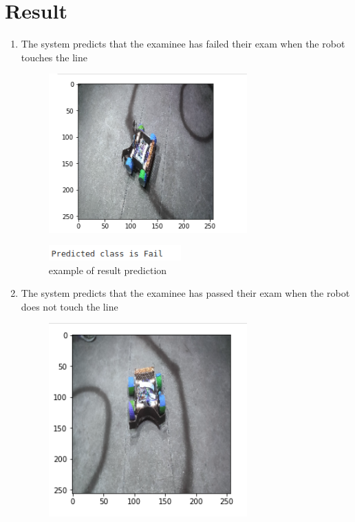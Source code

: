 \section{Result}
\begin{enumerate}
\item The system predicts that the examinee has failed their exam when the robot touches the line
\begin{figure}[H] %
\begin{center}
	\includegraphics[width = 3in]{images/linet.png}
	\label{figSample1} %
\end{center}
\end{figure}
\begin{figure}[H] %
\begin{center}
	\includegraphics[width = 2in]{images/linetr.png}
	\caption{example of result prediction} %
	\label{figSample1} %
\end{center}
\end{figure}
\item The system predicts that the examinee has passed their exam when the robot does not touch the line
\begin{figure}[H] %
\begin{center}
	\includegraphics[width = 3in]{images/linent.png}

\end{center}
\end{figure}
\end{enumerate}
